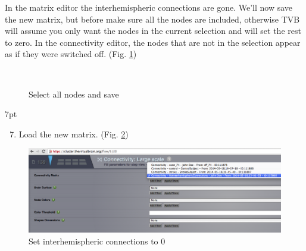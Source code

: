 \documentclass{tufte-handout}
\newenvironment{formal}{%
  \def\FrameCommand{%
    \hspace{1pt}%
    {\color{DarkBlue}\vrule width 2pt}%
    {\color{formalshade}\vrule width 4pt}%
    \colorbox{formalshade}%
  }%
  \MakeFramed{\advance\hsize-\width\FrameRestore}%
  \noindent\hspace{-4.55pt}%
  \begin{adjustwidth}{}{7pt}%
  \vspace{2pt}\vspace{2pt}%
}
{%
  \vspace{2pt}\end{adjustwidth}\endMakeFramed%
}
\begin{document}
\noindent In the matrix editor the interhemispheric connections are gone.
We'll now save the new matrix, but before make sure all the nodes are
included, otherwise TVB will assume you only want the nodes in the current
selection and will set the rest to zero. In the connectivity editor, the nodes
that are not in the selection appear as if they were switched off. (Fig. \ref{fig:steps_save})

\begin{figure}%
  \\
  \caption{Select all nodes and save}
  \label{fig:steps_save}
\end{figure}


\begin{formal}
  \begin{enumerate}[resume]
  \setcounter{enumi}{6}
    \item Load the new matrix. (Fig. \ref{fig:steps_07})
  \end{enumerate}
\end{formal}

\begin{figure}[h]
  \includegraphics[width=\linewidth]{Handout_UI_ModellingStructuralLesions_LoadNewMatrix}%
  \caption{Set interhemispheric connections to 0}%
  \label{fig:steps_07}%
\end{figure}
\end{document}

